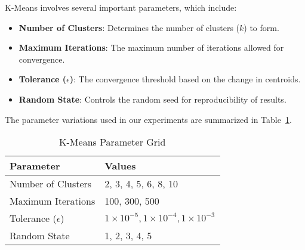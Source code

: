 K-Means involves several important parameters, which include:

\begin{itemize}
    \item \textbf{Number of Clusters}: Determines the number of clusters (\(k\)) to form.
    \item \textbf{Maximum Iterations}: The maximum number of iterations allowed for convergence.
    \item \textbf{Tolerance (\(\epsilon\))}: The convergence threshold based on the change in centroids.
    \item \textbf{Random State}: Controls the random seed for reproducibility of results.
\end{itemize}

The parameter variations used in our experiments are summarized in Table~\ref{tab:kmeans-param-grid}.

\begin{table}[h!]
\centering
\caption{K-Means Parameter Grid}
\label{tab:kmeans-param-grid}
\begin{tabularx}{\columnwidth}{|X|X|}
\hline
\textbf{Parameter} & \textbf{Values} \\ \hline
Number of Clusters  & 2, 3, 4, 5, 6, 8, 10 \\ \hline
Maximum Iterations & 100, 300, 500 \\ \hline
Tolerance (\(\epsilon\)) & \(1 \times 10^{-5}, 1 \times 10^{-4}, 1 \times 10^{-3}\) \\ \hline
Random State & 1, 2, 3, 4, 5 \\ \hline
\end{tabularx}
\end{table}
